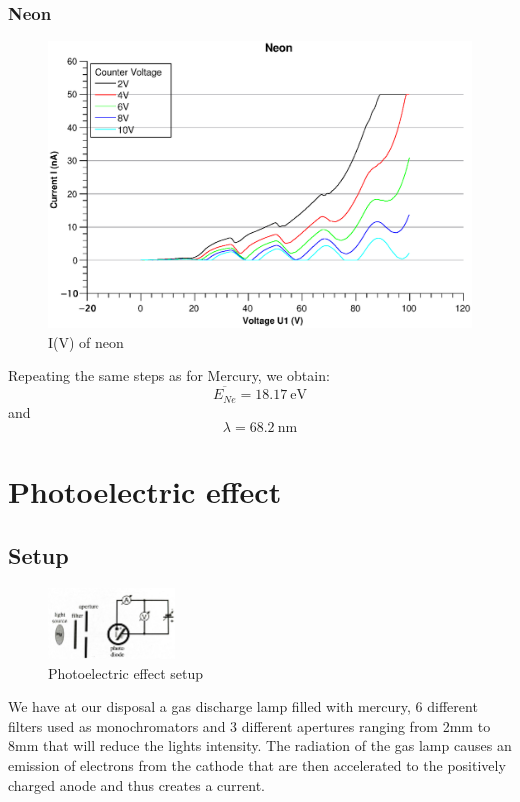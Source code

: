 \documentclass{scrartcl}
\begin{document}

\subsubsection{Neon}
\begin{figure}[h]
    \centering
    \includegraphics[width = 14cm]{Neon.eps}
    \caption{I(V) of neon}
    \label{fig:my_label}
\end{figure}
\FloatBarrier

\noindent Repeating the same steps as for Mercury, we obtain: \[\boxed{\overline{E_{Ne}}=18.17 \ \text{eV}} \] and \[ \boxed{\lambda = 68.2 \ \text{nm}}\]

\section{Photoelectric effect}

\subsection{Setup}
\begin{figure}
\centering
    \includegraphics[width=0.3\textwidth]{kk_2.jpg}
    \caption{Photoelectric effect setup}
\end{figure}

We have at our disposal a gas discharge lamp filled with mercury, 6 different filters used as monochromators and 3 different apertures ranging from 2mm to 8mm that will reduce the lights intensity. The radiation of the gas lamp causes an emission of electrons from the cathode that are then accelerated to the positively charged anode and thus creates a current.
\end{document}
